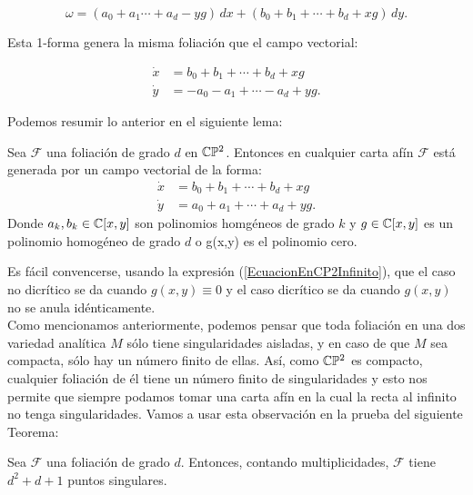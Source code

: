 \begin{equation}
\omega=(a_{0}+a_{1}\cdots+a_{d}-yg)\, dx+(b_{0}+b_{1}+\cdots+b_{d}+xg)\, dy.
\end{equation} 

\noindent Esta 1-forma genera la misma foliación que el campo vectorial:

\begin{equation}
\begin{aligned}
\dot{x} &= b_{0}+b_{1}+\cdots+b_{d}+xg\\
\dot{y} &= -a_{0}-a_{1}+\cdots-a_{d}+yg.
\end{aligned}
\end{equation}

Podemos resumir lo anterior en el siguiente lema:

\begin{Lema}
Sea $\mathcal{F}$ una foliación de grado $d$ en $\mathbb{C}\mathbb{P}^{2}$. Entonces en cualquier carta afín $\mathcal{F}$ está generada por un campo vectorial de la forma:
\begin{equation}
\begin{aligned}
\dot{x} &= b_{0}+b_{1}+\cdots+b_{d}+xg\\
\dot{y} &= a_{0}+a_{1}+\cdots+a_{d}+yg.
\end{aligned}
\end{equation}
Donde $a_{k},b_{k}\in\mathbb{C}[x,y]$ son polinomios homgéneos de grado $k$ y $g\in\mathbb{C}[x,y]$ es un polinomio homogéneo de grado $d$ o g(x,y) es el polinomio cero.
\end{Lema}

Es fácil convencerse, usando la expresión (\ref{EcuacionEnCP2Infinito}), que el caso no dicrítico se da cuando $g(x,y)\equiv 0$ y el caso dicrítico se da cuando $g(x,y)$ no se anula idénticamente.\\

Como mencionamos anteriormente, podemos pensar que toda foliación en una dos variedad analítica $M$ sólo tiene singularidades aisladas, y en caso de que $M$ sea compacta, sólo hay un número finito de ellas. Así, como $\mathbb{C}\mathbb{P}^{2}$ es compacto, cualquier foliación de él tiene un número finito de singularidades y esto nos permite que siempre podamos tomar una carta afín en la cual la recta al infinito no tenga singularidades. Vamos a usar esta observación en la prueba del siguiente Teorema:

\begin{Teorema}
Sea $\mathcal{F}$ una foliación de grado $d$. Entonces, contando multiplicidades, $\mathcal{F}$ tiene $d^{2}+d+1$ puntos singulares.
\end{Teorema}

